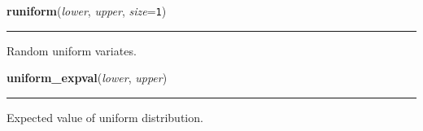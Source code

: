    \begin{boxedminipage}{\textwidth}

    \raggedright \textbf{runiform}(\textit{lower}, \textit{upper}, \textit{size}=\texttt{1})

    \vspace{-1.5ex}

    \rule{\textwidth}{0.5\fboxrule}

Random uniform variates.
    \vspace{1ex}

    \end{boxedminipage}

    \label{pymc:distributions:uniform_expval}

    \vspace{0.5ex}

    \begin{boxedminipage}{\textwidth}

    \raggedright \textbf{uniform\_expval}(\textit{lower}, \textit{upper})

    \vspace{-1.5ex}

    \rule{\textwidth}{0.5\fboxrule}

Expected value of uniform distribution.
    \vspace{1ex}

    \end{boxedminipage}

    \label{pymc:distributions:uniform_like}

    \vspace{0.5ex}

